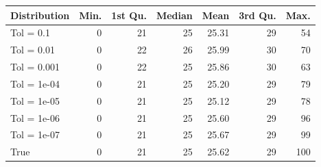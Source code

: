 \begin{figure} 
\begin{tabular}{lrrrrrr}
 Distribution & Min. & 1st Qu. & Median & Mean & 3rd Qu. & Max. \\ 
  \hline
\hline
Tol =  0.1 & 0 & 21 & 25 & 25.31 & 29 & 54 \\ 
  Tol =  0.01 & 0 & 22 & 26 & 25.99 & 30 & 70 \\ 
  Tol =  0.001 & 0 & 22 & 25 & 25.86 & 30 & 63 \\ 
  Tol =  1e-04 & 0 & 21 & 25 & 25.20 & 29 & 79 \\ 
  Tol =  1e-05 & 0 & 21 & 25 & 25.12 & 29 & 78 \\ 
  Tol =  1e-06 & 0 & 21 & 25 & 25.60 & 29 & 96 \\ 
  Tol =  1e-07 & 0 & 21 & 25 & 25.67 & 29 & 99 \\ 
  True & 0 & 21 & 25 & 25.62 & 29 & 100 \\ 
  \end{tabular}
\label{tab:SummaryTable}
\end{figure} 
